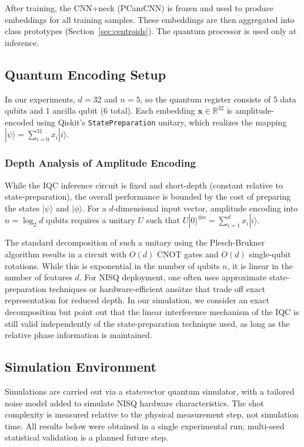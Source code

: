 \documentclass[conference]{IEEEtran}
\begin{document}
After training, the CNN+neck (PCamCNN) is frozen and used to produce embeddings for all training samples. These embeddings are then aggregated into class prototypes (Section~\ref{sec:centroids}). The quantum processor is used only at inference.

\subsection{Quantum Encoding Setup}
In our experiments, $d = 32$ and $n = 5$, so the quantum register consists of 5 data qubits and 1 ancilla qubit (6 total). Each embedding $\mathbf{x} \in \mathbb{R}^{32}$ is amplitude-encoded using Qiskit's \texttt{StatePreparation} unitary, which realizes the mapping $|\psi\rangle = \sum_{i=0}^{31} x_i|i\rangle$.

\subsubsection{Depth Analysis of Amplitude Encoding}
While the IQC inference circuit is fixed and short-depth (constant relative to state-preparation), the overall performance is bounded by the cost of preparing the states $|\psi\rangle$ and $|\phi\rangle$. For a $d$-dimensional input vector, amplitude encoding into $n = \log_2 d$ qubits requires a unitary $U$ such that $U|0\rangle^{\otimes n} = \sum_{i=1}^d x_i |i\rangle$.

The standard decomposition of such a unitary using the Plesch-Brukner algorithm \cite{plesch2011quantum} results in a circuit with $O(d)$ CNOT gates and $O(d)$ single-qubit rotations. While this is exponential in the number of qubits $n$, it is linear in the number of features $d$. For NISQ deployment, one often uses approximate state-preparation techniques or hardware-efficient ans\"atze that trade off exact representation for reduced depth. In our simulation, we consider an exact decomposition but point out that the linear interference mechanism of the IQC is still valid independently of the state-preparation technique used, as long as the relative phase information is maintained.

\subsection{Simulation Environment}
Simulations are carried out via a statevector quantum simulator, with a tailored noise model added to simulate NISQ hardware characteristics. The shot complexity is measured relative to the physical measurement step, not simulation time. All results below were obtained in a single experimental run; multi-seed statistical validation is a planned future step.
\end{document}
